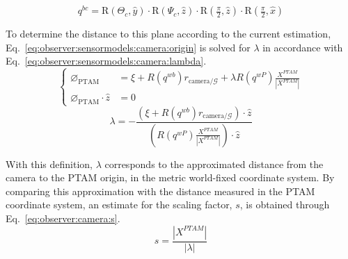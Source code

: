         \begin{equation}
        \label{eq:observer:sensormodels:qbc}
            q^{bc} = \text{R}(\Theta_{c}, \hat{y}) \cdot \text{R}(\Psi_{c}, \hat{z}) \cdot \text{R}(\tfrac{\pi}{2}, \hat{z}) \cdot \text{R}(\tfrac{\pi}{2}, \hat{x})
        \end{equation}

        To determine the distance to this plane according to the current estimation,
        Eq.~\eqref{eq:observer:sensormodels:camera:origin} is solved for $\lambda$
        in accordance with Eq.~\eqref{eq:observer:sensormodels:camera:lambda}.
        \begin{equation}
            \left\lbrace
            \begin{array}{ll}
                \varnothing_{\text{PTAM}} &= \xi + R(q^{wb}) r_{\text{camera}/\mathcal{G}} + \lambda R(q^{wP}) \frac{X^{PTAM}}{|X^{PTAM}|} \\
                \varnothing_{\text{PTAM}} \cdot \hat{z} &= 0
            \end{array}\right.
            \label{eq:observer:sensormodels:camera:origin}
        \end{equation}
        \begin{equation}
            \lambda = -\frac{\left(\xi + R(q^{wb}) r_{\text{camera}/\mathcal{G}} \right) \cdot \hat{z}}{\left( R(q^{wP}) \frac{X^{PTAM}}{|X^{PTAM}|} \right) \cdot \hat{z}}
            \label{eq:observer:sensormodels:camera:lambda}
        \end{equation}



        With this definition, $\lambda$ corresponds to the approximated distance
        from the camera to the PTAM origin, in the metric world-fixed coordinate system.
        By comparing this approximation with the distance measured
        in the PTAM coordinate system, an estimate for the scaling factor, $s$, is obtained
        through Eq.~\eqref{eq:observer:camera:s}.
        \begin{equation}
        \label{eq:observer:camera:s}
            s = \frac{|X^{PTAM}|}{|\lambda|}
        \end{equation}


